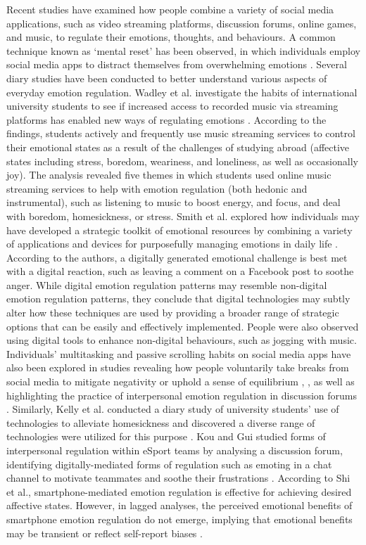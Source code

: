 Recent studies have examined how people combine a variety of social media applications, such as video streaming platforms, discussion forums, online games, and music, to regulate their emotions, thoughts, and behaviours. A common technique known as `mental reset' has been observed, in which individuals employ social media apps to distract themselves from overwhelming emotions \cite{eschler2020emergent}. Several diary studies have been conducted to better understand various aspects of everyday emotion regulation. Wadley et al. investigate the habits of international university students to see if increased access to recorded music via streaming platforms has enabled new ways of regulating emotions \cite{wadley2019use}. According to the findings, students actively and frequently use music streaming services to control their emotional states as a result of the challenges of studying abroad (affective states including stress, boredom, weariness, and loneliness, as well as occasionally joy). The analysis revealed five themes in which students used online music streaming services to help with emotion regulation (both hedonic and instrumental), such as listening to music to boost energy, and focus, and deal with boredom, homesickness, or stress. Smith et al. explored how individuals may have developed a strategic toolkit of emotional resources by combining a variety of applications and devices for purposefully managing emotions in daily life \cite{smith2022digital}. According to the authors, a digitally generated emotional challenge is best met with a digital reaction, such as leaving a comment on a Facebook post to soothe anger. While digital emotion regulation patterns may resemble non-digital emotion regulation patterns, they conclude that digital technologies may subtly alter how these techniques are used by providing a broader range of strategic options that can be easily and effectively implemented. People were also observed using digital tools to enhance non-digital behaviours, such as jogging with music. Individuals' multitasking and passive scrolling habits on social media apps have also been explored in studies revealing how people voluntarily take breaks from social media to mitigate negativity or uphold a sense of equilibrium \cite{lukoff2018makes}, \cite{mark2015focused}, as well as highlighting the practice of interpersonal emotion regulation in discussion forums \cite{smith2022digital}. Similarly, Kelly et al. conducted a diary study of university students' use of technologies to alleviate homesickness and discovered a diverse range of technologies were utilized for this purpose \cite{kelly2021s}. Kou and Gui studied forms of interpersonal regulation within eSport teams by analysing a discussion forum, identifying digitally-mediated forms of regulation such as emoting in a chat channel to motivate teammates and soothe their frustrations \cite{kou2020emotion}. According to Shi et al., smartphone-mediated emotion regulation is effective for achieving desired affective states. However, in lagged analyses, the perceived emotional benefits of smartphone emotion regulation do not emerge, implying that emotional benefits may be transient or reflect self-report biases \cite{shi2023instant}.


